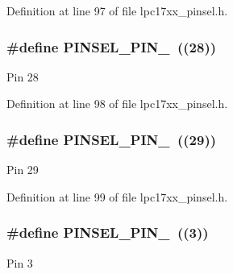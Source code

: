 Definition at line 97 of file lpc17xx\+\_\+pinsel.\+h.

\subsubsection[{\texorpdfstring{P\+I\+N\+S\+E\+L\+\_\+\+P\+I\+N\+\_\+28}{PINSEL_PIN_28}}]{\setlength{\rightskip}{0pt plus 5cm}\#define P\+I\+N\+S\+E\+L\+\_\+\+P\+I\+N\+\_~((28))}\hypertarget{group___p_i_n_s_e_l___public___macros_gaa2f94e6ccf0aafdc16627745d98678e3}{}\label{group___p_i_n_s_e_l___public___macros_gaa2f94e6ccf0aafdc16627745d98678e3}
Pin 28 

Definition at line 98 of file lpc17xx\+\_\+pinsel.\+h.

\subsubsection[{\texorpdfstring{P\+I\+N\+S\+E\+L\+\_\+\+P\+I\+N\+\_\+29}{PINSEL_PIN_29}}]{\setlength{\rightskip}{0pt plus 5cm}\#define P\+I\+N\+S\+E\+L\+\_\+\+P\+I\+N\+\_~((29))}\hypertarget{group___p_i_n_s_e_l___public___macros_gae2117d5933ea9ffd03005dcedaa8ffcd}{}\label{group___p_i_n_s_e_l___public___macros_gae2117d5933ea9ffd03005dcedaa8ffcd}
Pin 29 

Definition at line 99 of file lpc17xx\+\_\+pinsel.\+h.

\subsubsection[{\texorpdfstring{P\+I\+N\+S\+E\+L\+\_\+\+P\+I\+N\+\_\+3}{PINSEL_PIN_3}}]{\setlength{\rightskip}{0pt plus 5cm}\#define P\+I\+N\+S\+E\+L\+\_\+\+P\+I\+N\+\_~((3))}\hypertarget{group___p_i_n_s_e_l___public___macros_ga181d387f7b6aa5f8d11d11571e770792}{}\label{group___p_i_n_s_e_l___public___macros_ga181d387f7b6aa5f8d11d11571e770792}
Pin 3 

